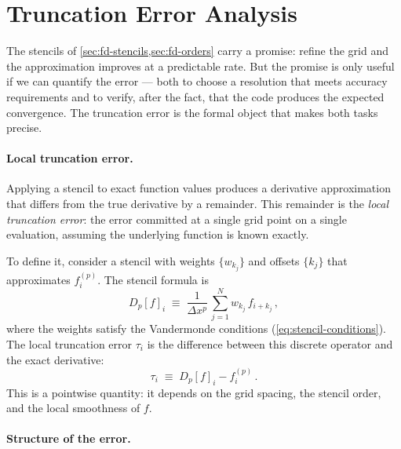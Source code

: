 \section{Truncation Error Analysis}
\label{sec:fd-truncation}

The stencils of \cref{sec:fd-stencils,sec:fd-orders} carry a promise:
refine the grid and the approximation improves at a predictable rate.  But
the promise is only useful if we can quantify the error --- both to choose
a resolution that meets accuracy requirements and to verify, after the
fact, that the code produces the expected convergence.  The truncation
error is the formal object that makes both tasks precise.

\paragraph{Local truncation error.}

Applying a stencil to exact function values produces a derivative
approximation that differs from the true derivative by a remainder.  This
remainder is the \emph{local truncation error}: the error committed at a
single grid point on a single evaluation, assuming the underlying function
is known exactly.

To define it, consider a stencil with weights $\{w_{k_j}\}$ and offsets
$\{k_j\}$ that approximates $f^{(p)}_i$.  The stencil formula is
%
\begin{equation}
  D_p[f]_i \;\equiv\;
  \frac{1}{\Delta x^p}\,\sum_{j=1}^{N} w_{k_j}\,f_{i+k_j} \,,
  \label{eq:stencil-operator}
\end{equation}
%
where the weights satisfy the Vandermonde conditions
(\cref{eq:stencil-conditions}).  The local truncation error $\tau_i$ is
the difference between this discrete operator and the exact derivative:
%
\begin{equation}
  \tau_i \;\equiv\; D_p[f]_i - f^{(p)}_i \,.
  \label{eq:lte-def}
\end{equation}
%
This is a pointwise quantity: it depends on the grid spacing, the stencil
order, and the local smoothness of $f$.

\paragraph{Structure of the error.}

